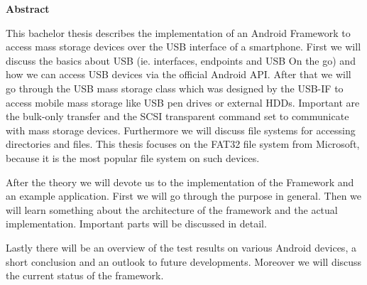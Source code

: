 

\clearemptydoublepage
{}
{}	





\vspace*{2cm}
\begin{center}
{\Large \bf Abstract}
\end{center}
\vspace{1cm}

This bachelor thesis describes the implementation of an Android Framework to access mass storage devices over the USB interface of a smartphone. First we will discuss the basics about USB (ie. interfaces, endpoints and USB On the go) and how we can access USB devices via the official Android API. After that we will go through the USB mass storage class which was designed by the USB-IF to access mobile mass storage like USB pen drives or external HDDs. Important are the bulk-only transfer and the SCSI transparent command set to communicate with mass storage devices. Furthermore we will discuss file systems for accessing directories and files. This thesis focuses on the FAT32 file system from Microsoft, because it is the most popular file system on such devices.

After the theory we will devote us to the implementation of the Framework and an example application. First we will go through the purpose in general. Then we will learn something about the architecture of the framework and the actual implementation. Important parts will be discussed in detail.

Lastly there will be an overview of the test results on various Android devices, a short conclusion and an outlook to future developments. Moreover we will discuss the current status of the framework. 